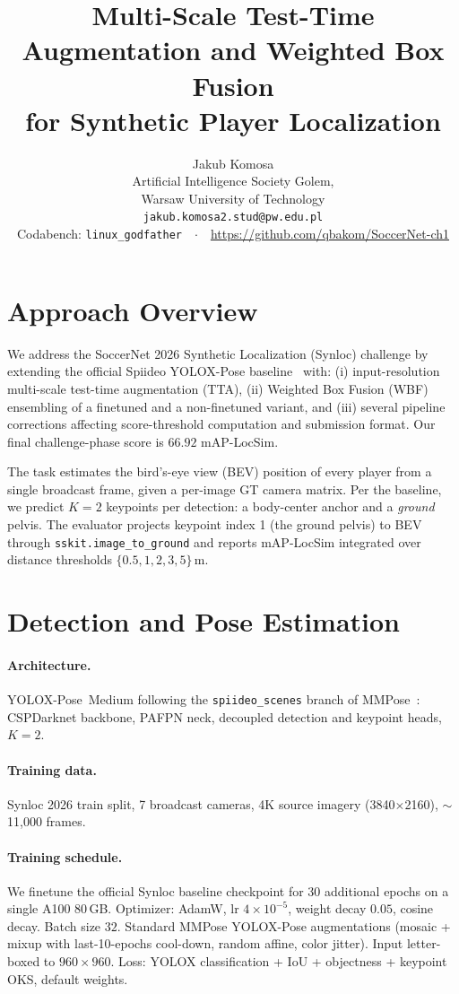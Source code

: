 \documentclass[10pt,twocolumn,letterpaper]{article}
\title{\vspace{-2em}Multi-Scale Test-Time Augmentation and Weighted Box Fusion\\
       for Synthetic Player Localization}
\author{Jakub Komosa\\
Artificial Intelligence Society Golem,\\Warsaw University of Technology\\
\texttt{jakub.komosa2.stud@pw.edu.pl}\\
\small Codabench: \texttt{linux\_godfather}~~$\cdot$~~\url{https://github.com/qbakom/SoccerNet-ch1}}
\date{}
\begin{document}
\maketitle

\section{Approach Overview}
\label{sec:overview}

We address the SoccerNet 2026 Synthetic Localization (Synloc) challenge by extending the official Spiideo YOLOX-Pose baseline~\cite{spiideo} with: (i) input-resolution multi-scale test-time augmentation (TTA), (ii) Weighted Box Fusion (WBF)~\cite{wbf} ensembling of a finetuned and a non-finetuned variant, and (iii) several pipeline corrections affecting score-threshold computation and submission format. Our final challenge-phase score is $\mathbf{66.92}$ mAP-LocSim.

The task estimates the bird's-eye view (BEV) position of every player from a single broadcast frame, given a per-image GT camera matrix. Per the baseline, we predict $K{=}2$ keypoints per detection: a body-center anchor and a \emph{ground} pelvis. The evaluator projects keypoint index 1 (the ground pelvis) to BEV through \texttt{sskit.image\_to\_ground} and reports mAP-LocSim integrated over distance thresholds $\{0.5, 1, 2, 3, 5\}\,\text{m}$.

\section{Detection and Pose Estimation}
\label{sec:model}

\paragraph{Architecture.} YOLOX-Pose~Medium following the \texttt{spiideo\_scenes} branch of MMPose~\cite{spiideo}: CSPDarknet backbone, PAFPN neck, decoupled detection and keypoint heads, $K=2$.

\paragraph{Training data.} Synloc 2026 train split, 7 broadcast cameras, 4K source imagery (3840$\times$2160), $\sim$11{,}000 frames.

\paragraph{Training schedule.} We finetune the official Synloc baseline checkpoint for 30 additional epochs on a single A100 80\,GB. Optimizer: AdamW, lr $4{\times}10^{-5}$, weight decay $0.05$, cosine decay. Batch size $32$. Standard MMPose YOLOX-Pose augmentations (mosaic + mixup with last-10-epochs cool-down, random affine, color jitter). Input letter-boxed to $960{\times}960$. Loss: YOLOX classification + IoU + objectness + keypoint OKS, default weights.
\end{document}
